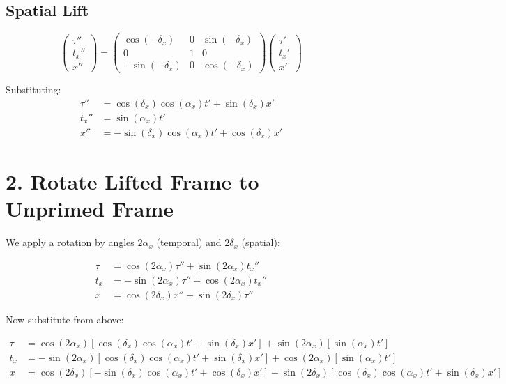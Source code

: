 \documentclass[12pt]{article}
\begin{document}
\subsection*{Spatial Lift}
\[
\begin{pmatrix}
\tau'' \\
t_x'' \\
x''
\end{pmatrix}
=
\begin{pmatrix}
\cos(-\delta_x) & 0 & \sin(-\delta_x) \\
0 & 1 & 0 \\
-\sin(-\delta_x) & 0 & \cos(-\delta_x)
\end{pmatrix}
\begin{pmatrix}
\tau' \\
t_x' \\
x'
\end{pmatrix}
\]

Substituting:
\[
\begin{aligned}
\tau'' &= \cos(\delta_x) \cos(\alpha_x) t' + \sin(\delta_x) x' \\
t_x'' &= \sin(\alpha_x) t' \\
x'' &= -\sin(\delta_x) \cos(\alpha_x) t' + \cos(\delta_x) x'
\end{aligned}
\]

\section*{2. Rotate Lifted Frame to Unprimed Frame}

We apply a rotation by angles $2\alpha_x$ (temporal) and $2\delta_x$ (spatial):

\[
\begin{aligned}
\tau &= \cos(2\alpha_x)\tau'' + \sin(2\alpha_x) t_x'' \\
t_x &= -\sin(2\alpha_x)\tau'' + \cos(2\alpha_x)t_x'' \\
x &= \cos(2\delta_x)x'' + \sin(2\delta_x)\tau''
\end{aligned}
\]

Now substitute from above:

\[
\begin{aligned}
\tau &= \cos(2\alpha_x) \left[\cos(\delta_x) \cos(\alpha_x) t' + \sin(\delta_x) x'\right] + \sin(2\alpha_x) \left[\sin(\alpha_x) t'\right] \\
t_x &= -\sin(2\alpha_x) \left[\cos(\delta_x) \cos(\alpha_x) t' + \sin(\delta_x) x'\right] + \cos(2\alpha_x) \left[\sin(\alpha_x) t'\right] \\
x &= \cos(2\delta_x) \left[ -\sin(\delta_x) \cos(\alpha_x) t' + \cos(\delta_x) x' \right] + \sin(2\delta_x) \left[ \cos(\delta_x) \cos(\alpha_x) t' + \sin(\delta_x) x' \right]
\end{aligned}
\]
\end{document}
